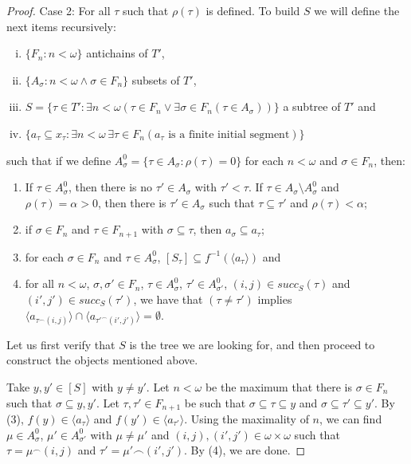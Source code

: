 \documentclass{amsart}
\theoremstyle{definition}
\theoremstyle{remark}
\numberwithin{equation}{section}
\begin{document}
\begin{proof}
    Case 2: For all $\tau$ such that $\rho(\tau)$ is defined. To build $S$ we will define the next items recursively:
    \begin{enumerate}[(i)]
        \item $\{F_n:n<\omega\}$ antichains of $T'$, %
        \item $\{A_\sigma:n<\omega\wedge \sigma\in F_n \}$ subsets of $T'$,
        \item $S=\{\tau\in T':\exists n<\omega(\tau\in F_n \vee \exists \sigma\in F_n (\tau\in A_\sigma) ) \}$ a subtree of $T'$ and
        \item $\{a_\tau\subseteq x_\tau: \exists n<\omega\,\exists \tau\in F_n  ( a_\tau \text{ is a finite initial segment}) \}$
    \end{enumerate}
    such that if we define $A_\sigma ^0=\{\tau\in A_\sigma:\rho(\tau)=0\}$ for each $n<\omega$ and $\sigma\in F_n$, then:
        \begin{enumerate}
        \item If $\tau\in  A_\sigma^0$, then there is no $\tau'\in A_\sigma$ with $\tau'<\tau$. If  $\tau \in A_\sigma\setminus A_\sigma^0$ and  $\rho(\tau)=\alpha>0$, then there is $\tau'\in A_\sigma$ such that $\tau\subseteq \tau'$ and $\rho(\tau)<\alpha$;
        \item  if $\sigma\in F_n$ and $\tau \in F_{n+1}$ with $\sigma\subseteq \tau$, then $a_\sigma\subseteq a_\tau$; %
        \item for each $\sigma\in F_n$ and $\tau\in A_\sigma^0$, $[S_\tau]\subseteq f^{-1}(\langle a_\tau \rangle)$ and
        \item for all $n<\omega$,  $\sigma,\sigma'\in F_n$, $\tau\in A_\sigma^0$, $\tau'\in A_{\sigma'}^0$, $(i,j)\in succ_S(\tau)$ and $(i',j')\in succ_S(\tau')$, we have that $(\tau\neq \tau')$ implies $\langle a_{\tau^\frown(i,j)} \rangle\cap \langle a_{\tau'^\frown(i',j')} \rangle=\emptyset$.
    \end{enumerate}

Let us first verify that $S$ is the tree we are looking for, and then proceed to construct the objects mentioned above.


Take $y,y'\in [S]$ with $y\neq y'$. Let $n<\omega$ be the maximum that there is $\sigma \in F_n$ such that $\sigma\subseteq y,y'$.  Let $\tau,\tau'\in F_{n+1}$ be such that $\sigma\subseteq \tau\subseteq y$ and $\sigma\subseteq \tau'\subseteq y'$. By (3), $f(y)\in \langle a_\tau\rangle$ and $f(y')\in \langle a_{\tau'}\rangle$. Using the maximality of  $n$, we can find $\mu\in A_\sigma^0 $, $\mu'\in A_{\sigma'}^0$ with $\mu\neq \mu'$ and $(i,j),(i',j')\in \omega\times \omega$ such that $\tau=\mu^\frown(i,j)$ and $\tau'=\mu'\frown(i',j')$. By (4), we are done.


\end{proof}
\end{document}
